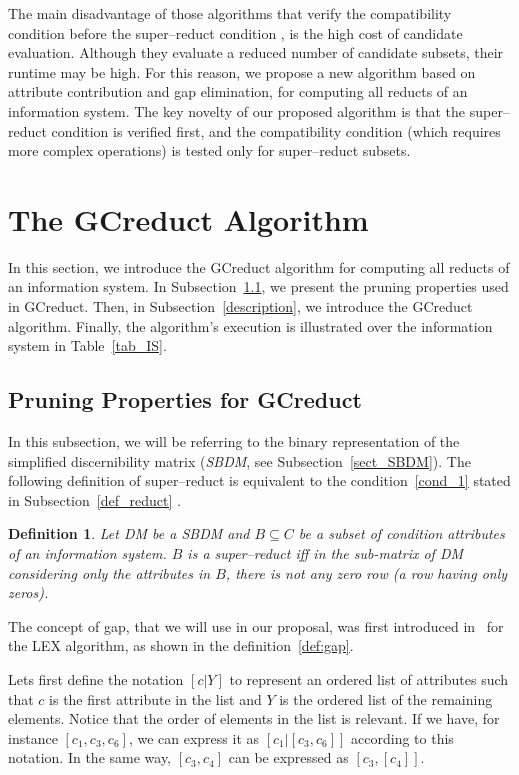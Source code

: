 \documentclass[number,preprint,review,12pt]{elsarticle}
\newtheorem{definition}{Definition}
\begin{document}
  The main disadvantage of those algorithms that verify the compatibility condition before the super--reduct condition \citep{Santiesteban03,WangP07,Lias13}, is the high cost of candidate evaluation. Although they evaluate a reduced number of candidate subsets, their runtime may be high. For this reason, we propose a new algorithm based on attribute contribution and gap elimination, for computing all reducts of an information system. The key novelty of our proposed algorithm is that the super--reduct condition is verified first, and the compatibility condition (which requires more complex operations) is tested only for super--reduct subsets.
  
  
\section{The GCreduct Algorithm}\label{GCreduct}
  In this section, we introduce the GCreduct algorithm for computing all reducts of an information system. In  Subsection~\ref{properties}, we present the pruning properties used in GCreduct. Then, in Subsection~\ref{description}, we introduce the GCreduct algorithm. Finally, the algorithm's execution is illustrated over the information system in Table~\ref{tab_IS}.
  
\subsection{Pruning Properties for GCreduct}\label{properties}
	In this subsection, we will be referring to the binary representation of the simplified discernibility matrix
	(\textit{SBDM}, see Subsection~\ref{sect_SBDM}). The following definition of super--reduct is equivalent to the condition~\ref{cond_1} stated in 
	Subsection~\ref{def_reduct} \citep{Lazo15}.
	
	\begin{definition}\label{def:testor}
		Let DM be a SBDM and $B \subseteq C$ be a subset of condition attributes of an information system. $B$ is a super--reduct iff in the sub-matrix of DM considering only the attributes in $B$, there is not any zero row (a row having only zeros).
	\end{definition}
	
	The concept of gap, that we will use in our proposal, was first introduced in~\cite{Santiesteban03} for the LEX algorithm, as shown in the definition~\ref{def:gap}.
	
	Lets first define the notation $[c|Y]$ to represent an ordered list of attributes such that $c$ is the first attribute in the list and $Y$ is the ordered list of the remaining elements. Notice that the order of elements in the list is relevant. If we have, for instance $[c_1,c_3,c_6]$, we can express it as $[c_1|[c_3,c_6]]$ according to this notation. In the same way, $[c_3,c_4]$ can be expressed as $[c_3,[c_4]]$.
	
\end{document}
